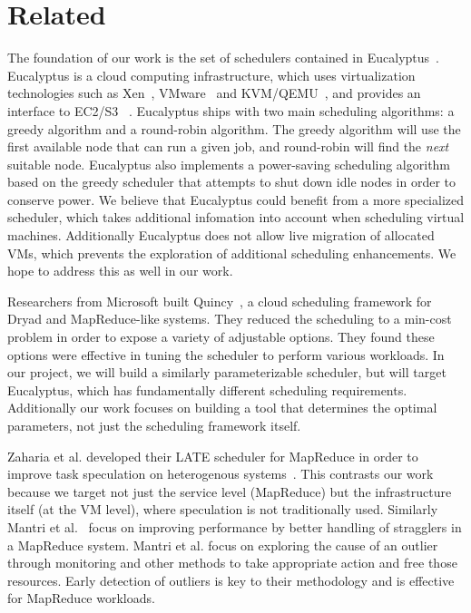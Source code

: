 \section{Related}

The foundation of our work is the set of schedulers contained in
Eucalyptus~\cite{Eucalyptus}.  Eucalyptus is a cloud computing infrastructure,
which uses virtualization technologies such as Xen~\cite{Xen},
VMware~\cite{VMware} and KVM/QEMU~\cite{QEMU}, and provides an interface to
EC2/S3 ~\cite{EC2,S3}.   Eucalyptus ships with two main scheduling algorithms: a
greedy algorithm and a round-robin algorithm.  The greedy algorithm will use the
first available node that can run a given job, and round-robin will find the
\emph{next} suitable node.  Eucalyptus also implements a power-saving scheduling
algorithm based on the greedy scheduler that attempts to shut down idle nodes
in order to conserve power.  We believe that Eucalyptus could benefit from a
more specialized scheduler, which takes additional infomation into account when
scheduling virtual machines.  Additionally Eucalyptus does not allow live
migration of allocated VMs, which prevents the exploration of additional
scheduling enhancements.  We hope to address this as well in our work.

Researchers from Microsoft built Quincy~\cite{Quincy}, a cloud
scheduling framework for Dryad and MapReduce-like systems.  They reduced the
scheduling to a min-cost problem in order to expose a variety of adjustable options.  They found these options were effective in tuning the scheduler to perform
various workloads.  In our project, we will build a similarly
parameterizable scheduler, but will target Eucalyptus, which has fundamentally
different scheduling requirements.  Additionally our work focuses on building a tool that determines the optimal parameters, not just the scheduling framework itself.

Zaharia et al. developed their LATE scheduler for MapReduce in order to improve task
speculation on heterogenous systems~\cite{Zaharia}.  This contrasts our work
because we target not just the service level (MapReduce) but the infrastructure
itself (at the VM level), where speculation is not traditionally used.
Similarly Mantri et al.~\cite{Mantri} focus on improving performance by better handling of stragglers  in
a MapReduce system.  Mantri et al. focus on exploring the
cause of an outlier through monitoring and other methods to take appropriate
action and free those resources.  Early detection of outliers is key to their methodology and is
effective for MapReduce workloads.

